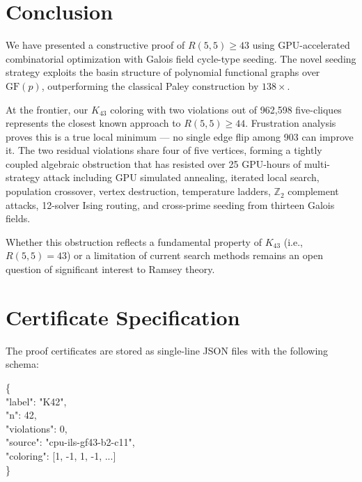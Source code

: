 \documentclass[11pt,a4paper]{article}
\theoremstyle{plain}
\theoremstyle{remark}
\newcommand{\GF}{\mathrm{GF}}
\begin{document}
\section{Conclusion}

We have presented a constructive proof of $R(5,5) \geq 43$ using
GPU-accelerated combinatorial optimization with Galois field
cycle-type seeding. The novel seeding strategy exploits the basin
structure of polynomial functional graphs over $\GF(p)$,
outperforming the classical Paley construction by $138\times$.

At the frontier, our $K_{43}$ coloring with two violations out of
962{,}598 five-cliques represents the closest known approach to
$R(5,5) \geq 44$. Frustration analysis proves this is a true local
minimum --- no single edge flip among 903 can improve it. The two
residual violations share four of five vertices, forming a tightly
coupled algebraic obstruction that has resisted over 25 GPU-hours of
multi-strategy attack including GPU simulated annealing, iterated
local search, population crossover, vertex destruction, temperature
ladders, $\mathbb{Z}_2$ complement attacks, 12-solver Ising routing,
and cross-prime seeding from thirteen Galois fields.

Whether this obstruction reflects a fundamental property of $K_{43}$
(i.e., $R(5,5) = 43$) or a limitation of current search methods
remains an open question of significant interest to Ramsey theory.

\appendix
\section{Certificate Specification}
\label{app:certificate}

The proof certificates are stored as single-line JSON files with the
following schema:

\begin{tcolorbox}[colback=reedsbg, colframe=accent!50, fontupper=\small\ttfamily,
  title={\small\bfseries Certificate JSON Schema}, coltitle=white,
  colbacktitle=accent]
\{\\
\quad "label": "K42",\\
\quad "n": 42,\\
\quad "violations": 0,\\
\quad "source": "cpu-ils-gf43-b2-c11",\\
\quad "coloring": [1, -1, 1, -1, ...]\\
\}
\end{tcolorbox}
\end{document}
